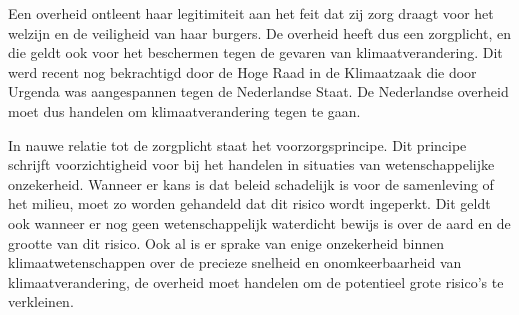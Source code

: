 
Een overheid ontleent haar legitimiteit aan het feit dat zij zorg draagt voor het welzijn en de veiligheid van haar burgers. De overheid heeft dus een zorgplicht, en die geldt ook voor het beschermen tegen de gevaren van klimaatverandering. Dit werd recent nog bekrachtigd door de Hoge Raad in de Klimaatzaak die door Urgenda was aangespannen tegen de Nederlandse Staat. De Nederlandse overheid moet dus handelen om klimaatverandering tegen te gaan.

In nauwe relatie tot de zorgplicht staat het voorzorgsprincipe. Dit principe schrijft voorzichtigheid voor bij het handelen in situaties van wetenschappelijke onzekerheid. Wanneer er kans is dat beleid schadelijk is voor de samenleving of het milieu, moet zo worden gehandeld dat dit risico wordt ingeperkt. Dit geldt ook wanneer er nog geen wetenschappelijk waterdicht bewijs is over de aard en de grootte van dit risico. Ook al is er sprake van enige onzekerheid binnen klimaatwetenschappen over de precieze snelheid en onomkeerbaarheid van klimaatverandering, de overheid moet handelen om de potentieel grote risico’s te verkleinen.
